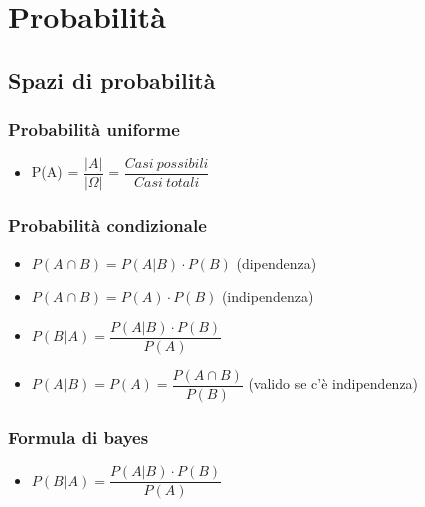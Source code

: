 
\chapter{Probabilità}
\section{Spazi di probabilità}
\subsection{Probabilità uniforme}
\begin{itemize}
	\item P(A) = $\dfrac{|A|}{|\Omega|}$ = $\dfrac{Casi \ possibili}{Casi\  totali}$
\end{itemize}
\subsection{Probabilità condizionale}
\begin{itemize}
	\item $P(A \cap B) = P(A|B) \cdot P(B)$ (dipendenza)
	\item $P(A \cap B) = P(A) \cdot P(B)$  (indipendenza)
	\item $P(B|A) = \dfrac{P(A|B) \cdot P(B)}{P(A)}$
	\item $P(A|B) = P(A) = \dfrac{P(A \cap B)}{P(B)}$ (valido se c'è indipendenza)
\end{itemize}
\subsection{Formula di bayes}
\begin{itemize}
	\item $P(B|A) = \dfrac{P(A|B) \cdot P(B)}{P(A)}$
\end{itemize}
